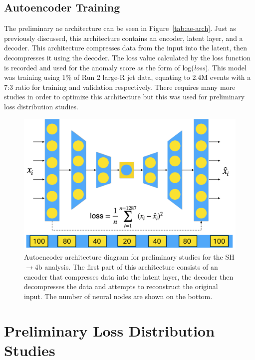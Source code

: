 \subsection{Autoencoder Training}

The preliminary \gls{ae} architecture can be seen in Figure~\ref{tab:ae-arch}. Just as previously discussed, this architecture contains an encoder, latent layer, and a decoder. This 
architecture compresses data from the input into the latent, then decompresses it using the decoder. The loss value calculated by the loss function is recorded and used 
for the anomaly score as the form of log(\textit{loss}). This model was training using 1\% of Run 2 large-R jet data, equating to 2.4M events with a 7:3 ratio for training 
and validation respectively. There requires many more studies in order to optimize this architecture but this was used for preliminary loss distribution studies. 

\begin{figure}[ht]
    \centering
    \includegraphics[scale=0.7]{figs/ch7/ae-arch.png}%
    \caption{Autoencoder architecture diagram for preliminary studies for the SH$\rightarrow$4b analysis. The first part of this architecture consists of an encoder that compresses 
    data into the latent layer, the decoder then decompresses the data and attempts to reconstruct the original input. The number of neural nodes are shown on the bottom.}
\label{fig:sh4b-ae-arch}
\end{figure}

\section{Preliminary Loss Distribution Studies}

